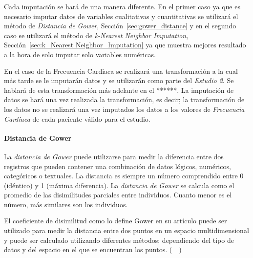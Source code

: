 Cada imputación se hará de una manera diferente. En el primer caso ya que es necesario imputar datos de variables cualitativas y cuantitativas se utilizará el método de \textit{Distancia de Gower}, Sección~\ref{sec:gower_distance} y en el segundo caso se utilizará el método de \textit{k-Nearest Neighbor Imputation}, Sección~\ref{sec:k_Nearest Neighbor_Imputation} ya que muestra mejores resultado a la hora de solo imputar solo variables numéricas.

En el caso de la Frecuencia Cardiaca se realizará una transformación a la cual más tarde se le imputarán datos y se utilizarán como parte del \textit{Estudio 2}. Se hablará de esta transformación más adelante en el ******. La imputación de datos se hará una vez realizada la transformación, es decir; la transformación de los datos no se realizará una vez imputados los datos a los valores de \textit{Frecuencia Cardiaca} de cada paciente válido para el estudio.

\paragraph*{Distancia de Gower}\label{sec:gower_distance}

La \textit{distancia de Gower} puede utilizarse para medir la diferencia entre dos registros que pueden contener una combinación de datos lógicos, numéricos, categóricos o textuales. La distancia es siempre un número comprendido entre 0 (idéntico) y 1 (máxima diferencia). La \textit{distancia de Gower} se calcula como el promedio de las disimilitudes parciales entre individuos. Cuanto menor es el número, más similares son los individuos.

El coeficiente de disimilitud como lo define Gower en su artículo puede ser utilizado para medir la distancia entre dos puntos en un espacio multidimensional y puede ser calculado utilizando diferentes métodos; dependiendo del tipo de datos y del espacio en el que se encuentran los puntos. (~\cite{Gower1971}~)

